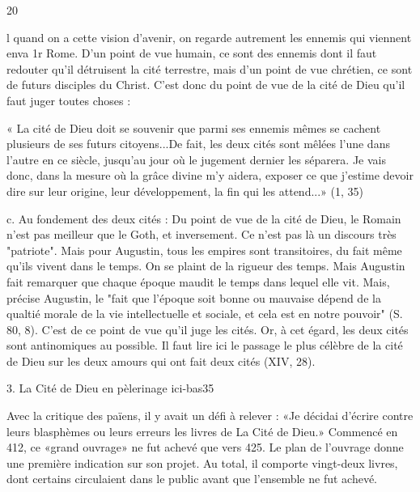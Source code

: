 20
 
l
quand on a cette vision d'avenir, on regarde autrement les ennemis qui viennent enva 1r Rome. D'un point de vue humain, ce sont des ennemis dont il faut redouter qu'il détruisent la cité terrestre, mais d'un point de vue chrétien, ce sont de futurs disciples du Christ. C'est donc du point de vue de la cité de Dieu qu'il faut juger toutes choses :

« La cité de Dieu doit se souvenir que parmi ses ennemis mêmes se cachent plusieurs de ses futurs citoyens...De fait, les deux cités sont mêlées l'une dans l'autre en ce siècle, jusqu'au jour où le jugement dernier les séparera. Je vais donc, dans la mesure où la grâce divine m'y aidera, exposer ce que j'estime devoir dire sur leur origine, leur développement, la fin qui les attend...» (1, 35)

c.	Au fondement des deux cités : Du point de vue de la cité de Dieu, le Romain n'est pas meilleur que le Goth, et inversement. Ce n'est pas là un discours très "patriote". Mais pour Augustin, tous les empires sont transitoires, du fait même qu'ils vivent dans le temps. On se plaint de la rigueur des temps. Mais Augustin fait remarquer que chaque époque maudit le temps dans lequel elle vit. Mais, précise Augustin, le "fait que l'époque soit bonne ou mauvaise dépend de la qualtié morale de la vie intellectuelle et sociale, et cela est en notre pouvoir" (S. 80, 8). C'est de ce point de vue qu'il juge les cités. Or, à cet égard, les deux cités sont antinomiques au possible. Il faut lire ici le passage le plus célèbre de la cité de Dieu sur les deux amours qui ont fait deux cités (XIV, 28).

3.	La Cité de Dieu en pèlerinage ici-bas35

Avec la critique des païens, il y avait un défi à relever : «Je décidai d'écrire contre leurs blasphèmes ou leurs erreurs les livres de La Cité de Dieu.» Commencé en 412, ce «grand ouvrage» ne fut achevé que vers 425. Le plan de l'ouvrage donne une première indication sur son projet. Au total, il comporte vingt-deux livres, dont certains circulaient dans le public avant que l'ensemble ne fut achevé.

